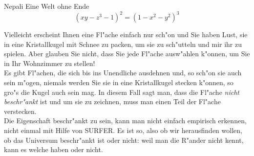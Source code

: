 \begin{surferPage}{Nepali}
Eine Welt ohne Ende \\

\smallskip
\[(x y - z^3 -1)^2= (1 - x^2	- y^2)^3\]

\singlespacing
Vielleicht erscheint Ihnen eine Fl"ache einfach nur sch"on und Sie haben Lust, sie in eine Kristallkugel mit Schnee zu packen, um sie zu sch"utteln und mir ihr zu spielen. Aber glauben Sie nicht, dass Sie jede Fl"ache ausw"ahlen k"onnen, um Sie in Ihr Wohnzimmer zu stellen! \\
\singlespacing
Es gibt Fl"achen, die sich bis ins Unendliche ausdehnen und, so sch"on sie auch sein m"ogen, niemals werden Sie sie in eine Kristallkugel stecken k"onnen, so gro"s die Kugel auch sein mag. In diesem Fall sagt man, dass die Fl"ache \textit{nicht beschr"ankt} ist und um sie zu zeichnen, muss man einen Teil der Fl"ache verstecken. \\
\singlespacing
Die Eigenschaft beschr"ankt zu sein, kann man nicht einfach empirisch erkennen, nicht einmal mit Hilfe von SURFER. Es ist so, also ob wir herausfinden wollen, ob das Universum beschr"ankt ist oder nicht: weil man die R"ander nicht kennt, kann es welche haben oder nicht.
\end{surferPage}
